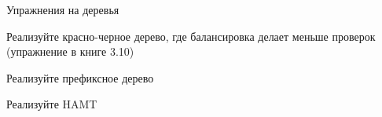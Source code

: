 \begin{frame}[allowframebreaks]{Упражнения на деревья}
\begin{exercise}[\exscore{?}{?}{?}]
Реализуйте красно-черное дерево, где балансировка делает меньше проверок (упражнение в книге 3.10)
\end{exercise}


\begin{exercise}[\exscore{?}{?}{?}]
Реализуйте префиксное дерево
\end{exercise}

\begin{exercise}[\exscore{?}{?}{?}]
Реализуйте HAMT
\end{exercise}

\end{frame}
